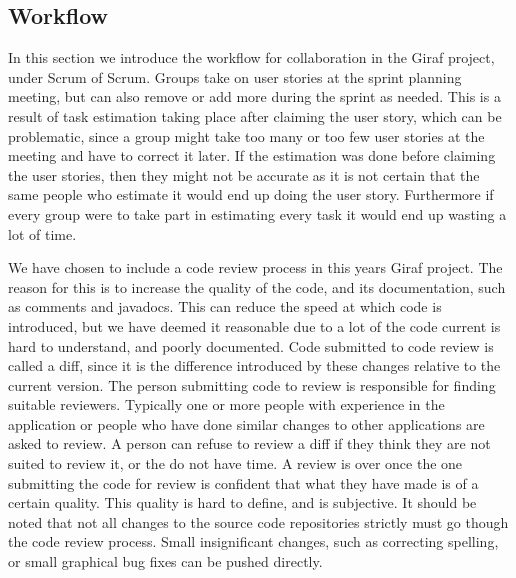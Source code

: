 \subsection*{Workflow}
In this section we introduce the workflow for collaboration in the Giraf project, under Scrum of Scrum. 
Groups take on user stories at the sprint planning meeting, but can also remove or add more during the sprint as needed. 
This is a result of task estimation taking place after claiming the user story, which can be problematic, since a group might take too many or too few user stories at the meeting and have to correct it later. 
If the estimation was done before claiming the user stories, then they might not be accurate as it is not certain that the same people who estimate it would end up doing the user story.
Furthermore if every group were to take part in estimating every task it would end up wasting a lot of time. 

We have chosen to include a code review process in this years Giraf project. 
The reason for this is to increase the quality of the code, and its documentation, such as comments and javadocs. 
This can reduce the speed at which code is introduced, but we have deemed it reasonable due to a lot of the code current is hard to understand, and poorly documented. 
Code submitted to code review is called a diff, since it is the difference introduced by these changes relative to the current version. 
The person submitting code to review is responsible for finding suitable reviewers.
Typically one or more people with experience in the application or people who have done similar changes to other applications are asked to review.
A person can refuse to review a diff if they think they are not suited to review it, or the do not have time. 
A review is over once the one submitting the code for review is confident that what they have made is of a certain quality.
This quality is hard to define, and is subjective.
It should be noted that not all changes to the source code repositories strictly must go though the code review process.
Small insignificant changes, such as correcting spelling, or small graphical bug fixes can be pushed directly. 

